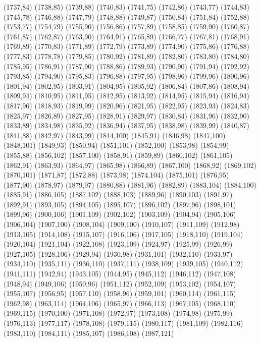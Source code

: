 (1737,84)
(1738,85)
(1739,88)
(1740,83)
(1741,75)
(1742,86)
(1743,77)
(1744,83)
(1745,78)
(1746,88)
(1747,79)
(1748,88)
(1749,87)
(1750,84)
(1751,84)
(1752,88)
(1753,77)
(1754,79)
(1755,90)
(1756,86)
(1757,89)
(1758,85)
(1759,90)
(1760,87)
(1761,87)
(1762,87)
(1763,90)
(1764,91)
(1765,89)
(1766,77)
(1767,81)
(1768,91)
(1769,89)
(1770,83)
(1771,89)
(1772,79)
(1773,89)
(1774,90)
(1775,86)
(1776,88)
(1777,83)
(1778,78)
(1779,85)
(1780,92)
(1781,89)
(1782,80)
(1783,80)
(1784,80)
(1785,95)
(1786,91)
(1787,90)
(1788,86)
(1789,93)
(1790,90)
(1791,94)
(1792,92)
(1793,85)
(1794,90)
(1795,83)
(1796,88)
(1797,95)
(1798,96)
(1799,96)
(1800,96)
(1801,94)
(1802,95)
(1803,91)
(1804,95)
(1805,92)
(1806,84)
(1807,86)
(1808,94)
(1809,94)
(1810,95)
(1811,95)
(1812,95)
(1813,92)
(1814,95)
(1815,94)
(1816,94)
(1817,96)
(1818,93)
(1819,99)
(1820,96)
(1821,95)
(1822,95)
(1823,93)
(1824,83)
(1825,97)
(1826,89)
(1827,95)
(1828,91)
(1829,97)
(1830,84)
(1831,96)
(1832,90)
(1833,89)
(1834,98)
(1835,92)
(1836,94)
(1837,95)
(1838,98)
(1839,99)
(1840,87)
(1841,88)
(1842,97)
(1843,99)
(1844,100)
(1845,91)
(1846,98)
(1847,100)
(1848,101)
(1849,93)
(1850,94)
(1851,101)
(1852,100)
(1853,98)
(1854,99)
(1855,88)
(1856,102)
(1857,100)
(1858,91)
(1859,89)
(1860,102)
(1861,105)
(1862,91)
(1863,93)
(1864,97)
(1865,98)
(1866,89)
(1867,100)
(1868,92)
(1869,102)
(1870,101)
(1871,87)
(1872,88)
(1873,98)
(1874,104)
(1875,101)
(1876,95)
(1877,90)
(1878,97)
(1879,97)
(1880,88)
(1881,96)
(1882,89)
(1883,104)
(1884,100)
(1885,91)
(1886,105)
(1887,102)
(1888,103)
(1889,96)
(1890,103)
(1891,97)
(1892,91)
(1893,105)
(1894,105)
(1895,107)
(1896,102)
(1897,96)
(1898,101)
(1899,96)
(1900,106)
(1901,109)
(1902,102)
(1903,109)
(1904,94)
(1905,106)
(1906,104)
(1907,100)
(1908,104)
(1909,100)
(1910,107)
(1911,109)
(1912,98)
(1913,105)
(1914,108)
(1915,107)
(1916,106)
(1917,105)
(1918,110)
(1919,104)
(1920,104)
(1921,104)
(1922,108)
(1923,109)
(1924,97)
(1925,99)
(1926,99)
(1927,105)
(1928,106)
(1929,94)
(1930,98)
(1931,101)
(1932,110)
(1933,97)
(1934,110)
(1935,111)
(1936,110)
(1937,111)
(1938,109)
(1939,105)
(1940,112)
(1941,111)
(1942,94)
(1943,105)
(1944,95)
(1945,112)
(1946,112)
(1947,108)
(1948,94)
(1949,106)
(1950,96)
(1951,112)
(1952,109)
(1953,102)
(1954,107)
(1955,107)
(1956,95)
(1957,110)
(1958,96)
(1959,101)
(1960,114)
(1961,115)
(1962,98)
(1963,114)
(1964,106)
(1965,97)
(1966,113)
(1967,105)
(1968,110)
(1969,115)
(1970,100)
(1971,108)
(1972,97)
(1973,108)
(1974,98)
(1975,99)
(1976,113)
(1977,117)
(1978,108)
(1979,115)
(1980,117)
(1981,109)
(1982,116)
(1983,110)
(1984,111)
(1985,107)
(1986,108)
(1987,121)
